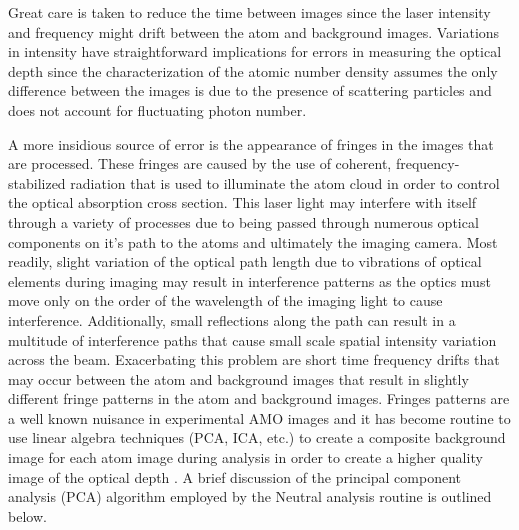 Great care is taken to reduce the time between images since the laser intensity and frequency might drift between the atom and background images. 
Variations in intensity have straightforward implications for errors in measuring the optical depth since the characterization of the atomic number density assumes the only difference between the images is due to the presence of scattering particles and does not account for fluctuating photon number. 

A more insidious source of error is the appearance of fringes in the images that are processed.
These fringes are caused by the use of coherent, frequency-stabilized radiation that is used to illuminate the atom cloud in order to control the optical absorption cross section.
This laser light may interfere with itself through a variety of processes due to being passed through numerous optical components on it's path to the atoms and ultimately the imaging camera.
Most readily, slight variation of the optical path length due to vibrations of optical elements during imaging may result in interference patterns as the optics must move only on the order of the wavelength of the imaging light to cause interference.
Additionally, small reflections along the path can result in a multitude of interference paths that cause small scale spatial intensity variation across the beam. 
Exacerbating this problem are short time frequency drifts that may occur between the atom and background images that result in slightly different fringe patterns in the atom and background images. 
Fringes patterns are a well known nuisance in experimental AMO images and it has become routine to use linear algebra techniques (PCA, ICA, etc.) to create a composite background image for each atom image during analysis in order to create a higher quality image of the optical depth \cite{Segal2009}.
A brief discussion of the principal component analysis (PCA) algorithm employed by the Neutral analysis routine is outlined below.

